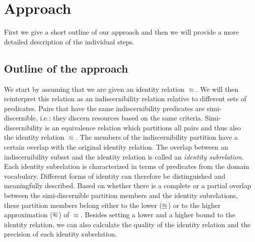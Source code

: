 \section{Approach}
\label{sec:approach}

First we give a short outline of our approach and then
  we will provide a more detailed description of the individual steps.

\subsection{Outline of the approach}

We start by assuming that we are given an identity relation $\approx$.
We will then reinterpret this relation as an indiscernibility relation
  relative to different sets of predicates.
Pairs that have the same indiscernibility predicates
  are simi-discernible, i.e.: they discern resources
  based on the same criteria.
Simi-discernibility is an equivalence relation
  which partitions all pairs and thus also the identity relation $\approx$.
The members of the indiscernibility partition
  have a certain overlap with the original identity relation.
The overlap between an indiscernibility subset and the identity relation
  is called an \emph{identity subrelation}.
Each identity subrelation is characterized in terms of predicates
  from the domain vocabulary.
Different forms of identity can therefore be distinguished
  and meaningfully described.
Based on whether there is a complete or a partial overlap
  between the simi-discernible partition members and
  the identity subrelations,
  these partition members belong either to the lower ($\underline{\approx}$)
  or to the higher approximation ($\overline{\approx}$) of $\approx$.
Besides setting a lower and a higher bound to the identity relation,
  we can also calculate the quality of the identity relation
  and the precision of each identity subrelation.




